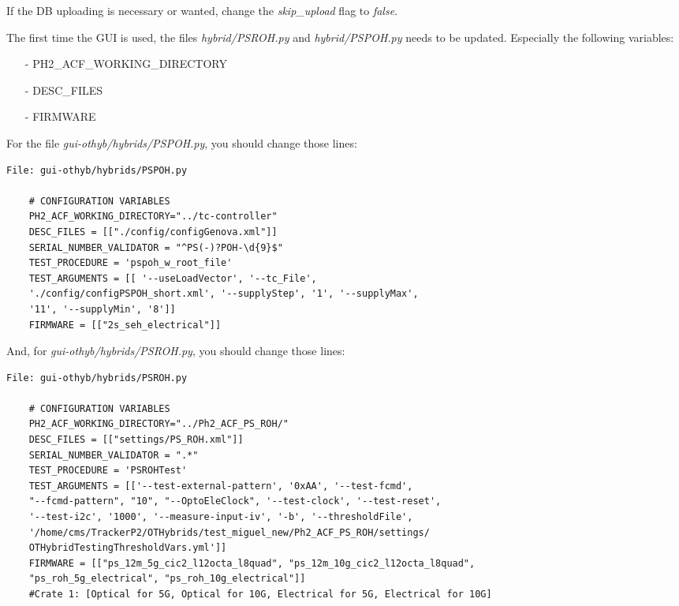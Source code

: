 \documentclass[10pt,a4paper]{article}
\begin{document}
If the DB uploading is necessary or wanted, change the \emph{skip\_upload} flag to \emph{false}.

The first time the GUI is used, the files \emph{hybrid/PSROH.py} and \emph{hybrid/PSPOH.py} needs to be updated. Especially the following variables:
\begin{itemize}
\item[-] PH2\_ACF\_WORKING\_DIRECTORY
\item[-] DESC\_FILES
\item[-] FIRMWARE
\end{itemize}

For the file \emph{gui-othyb/hybrids/PSPOH.py}, you should change those lines:

\begin{framed}
\begin{verbatim}
File: gui-othyb/hybrids/PSPOH.py

    # CONFIGURATION VARIABLES
    PH2_ACF_WORKING_DIRECTORY="../tc-controller"
    DESC_FILES = [["./config/configGenova.xml"]]
    SERIAL_NUMBER_VALIDATOR = "^PS(-)?POH-\d{9}$"
    TEST_PROCEDURE = 'pspoh_w_root_file'
    TEST_ARGUMENTS = [[ '--useLoadVector', '--tc_File', 
    './config/configPSPOH_short.xml', '--supplyStep', '1', '--supplyMax', 
    '11', '--supplyMin', '8']]
    FIRMWARE = [["2s_seh_electrical"]] 

\end{verbatim}
\end{framed}

And, for \emph{gui-othyb/hybrids/PSROH.py}, you should change those lines:

\begin{framed}
\begin{verbatim}
File: gui-othyb/hybrids/PSROH.py

    # CONFIGURATION VARIABLES
    PH2_ACF_WORKING_DIRECTORY="../Ph2_ACF_PS_ROH/"
    DESC_FILES = [["settings/PS_ROH.xml"]]
    SERIAL_NUMBER_VALIDATOR = ".*"
    TEST_PROCEDURE = 'PSROHTest'
    TEST_ARGUMENTS = [['--test-external-pattern', '0xAA', '--test-fcmd', 
    "--fcmd-pattern", "10", "--OptoEleClock", '--test-clock', '--test-reset', 
    '--test-i2c', '1000', '--measure-input-iv', '-b', '--thresholdFile', 
    '/home/cms/TrackerP2/OTHybrids/test_miguel_new/Ph2_ACF_PS_ROH/settings/
    OTHybridTestingThresholdVars.yml']]
    FIRMWARE = [["ps_12m_5g_cic2_l12octa_l8quad", "ps_12m_10g_cic2_l12octa_l8quad", 
    "ps_roh_5g_electrical", "ps_roh_10g_electrical"]]       
    #Crate 1: [Optical for 5G, Optical for 10G, Electrical for 5G, Electrical for 10G]

\end{verbatim}
\end{framed}
\end{document}
